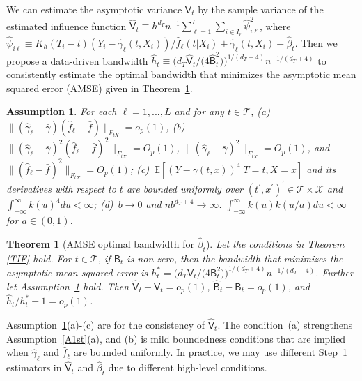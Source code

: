 \documentclass[lettersize, 12pt]{article}
\newtheorem{theorem}{Theorem}
\newtheorem{assumption}{Assumption}
\begin{document}
We can estimate the asymptotic variance $\mathsf{V}_t$ by the sample variance of the estimated influence function $\hat{\mathsf{V}}_t \equiv h^{d_T} n^{-1} \sum_{\ell=1}^L\sum_{i \in I_\ell} \hat \psi_{i\ell}^2$, where 
$\hat \psi_{i\ell} \equiv K_h(T_i-t) (Y_i - \hat \gamma_\ell(t,X_i) )/\hat f_\ell(t|X_i) +  \hat \gamma_\ell(t,X_i) - \hat\beta_t$.
Then we propose a data-driven bandwidth $\hat h_t \equiv  \big(d_T \hat{\mathsf{V}}_t\big/\big(4\hat{\mathsf{B}}_t^2\big)\big)^{1/(d_T+4)} n^{-1/(d_T+4)}$
to consistently estimate the optimal bandwidth that minimizes the asymptotic mean squared error (AMSE) given in Theorem~\ref{Tbw}.

\begin{assumption}
For each $\ell=1,...,L$ and for any $t\in \mathcal{T}$, 
(a)~$\|(\hat\gamma_\ell - \bar \gamma)(\hat f_\ell - \bar f)\|_{F_{tX}}  = o_p(1)$, 
(b)~$\|(\hat\gamma_\ell - \bar \gamma)^2(\hat f_\ell - \bar f)^2\|_{F_{tX}} = O_p(1)$, 
$\|(\hat\gamma_\ell - \bar \gamma)^2\|_{F_{tX}} = O_p(1)$, and 
$\|(\hat f_\ell - \bar f)^2\|_{F_{tX}} = O_p(1)$;
(c)~$\mathbb{E}[(Y-\bar \gamma(t, x))^4|T=t, X=x]$ and its derivatives with respect to $t$ are bounded uniformly over $(t^\prime,x^\prime)^\prime \in \mathcal{T}\times\mathcal{X}$
and $\int_{-\infty}^\infty k(u)^4 du < \infty$;
(d)~$b\rightarrow 0$ and $nb^{d_T + 4} \rightarrow \infty$. $\int_{-\infty}^\infty k(u)k(u/a) du < \infty$ for $a\in (0,1)$.
\label{AOptBW}
\end{assumption}


\begin{theorem}[AMSE optimal bandwidth for $\hat\beta_t$]
Let the conditions in Theorem \ref{TIF} hold.
For $t\in\mathcal{T}$, if $\mathsf{B}_t$ is non-zero, then the bandwidth that minimizes the asymptotic mean squared error is 
$h^\ast_t =  \big(d_T \mathsf{V}_t\big/\big(4\mathsf{B}_t^2\big)\big)^{1/(d_T+4)} n^{-1/(d_T+4)}$.
Further let Assumption~\ref{AOptBW} hold.
Then $\hat{\mathsf{V}}_t - \mathsf{V}_t = o_p(1)$, $\hat{\mathsf{B}}_t - \mathsf{B}_t = o_p(1)$, and $\hat h_t/h_t^\ast -1 = o_p(1)$.
\label{Tbw}
\end{theorem}

Assumption~\ref{AOptBW}(a)-(c) are for the consistency of $\hat{\mathsf{V}}_t$. 
The condition~(a) strengthens Assumption~\ref{A1st}(a), and (b) is mild boundedness conditions that are implied when 
$\hat\gamma_\ell$ and $\hat f_\ell$ are bounded uniformly.  
In practice, we may use different Step~1 estimators in $\hat{\mathsf{V}}_t$ and $\hat\beta_t$ due to different high-level conditions.
\end{document}
